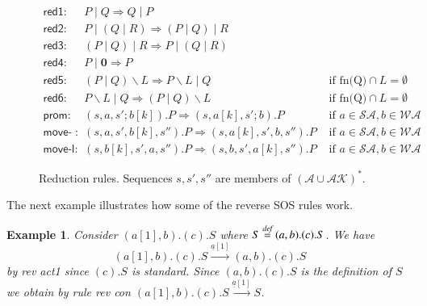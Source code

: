 \documentclass[review]{elsarticle}
\newcommand{\paral}{\; \vert \;}
\newcommand{\Par}{\mid}
\newcommand{\Nil}{\mathbf{0}}
\newcommand{\bydef}{\stackrel{\emph{def}}{=}}
\newcommand{\rulename}[1]{\textsf{#1}}
\newtheorem{example}{Example}
\begin{document}
\begin{figure}[t] 
\[
\begin{array}{lll}
\rulename{red1}: & P\Par Q \Rightarrow Q\Par P& 
\\[10pt]
\rulename{red2}: & P\Par (Q\Par R) \Rightarrow (P\Par Q)\Par R &
\\[10pt]
\rulename{red3}: & (P\Par Q)\Par R \Rightarrow P\Par (Q\Par R) & 
\\[10pt]
\rulename{red4}: & P\Par \Nil \Rightarrow P & 
\\[10pt]
\rulename{red5}: & (P\paral Q)\backslash L \Rightarrow P\backslash L \paral Q & \mbox{ if fn(Q)} \cap L = \emptyset
\\[10pt]
\rulename{red6}: & P\backslash L \paral Q \Rightarrow (P\paral Q)\backslash L & \mbox{ if fn(Q)} \cap L = \emptyset
\\[10pt]
\rulename{prom}: & (s,a,s';b[k]).P \Rightarrow (s,a[k],s';b).P & \mbox{ if } a \in \mathcal{SA}, b \in \mathcal{WA} 
\\[10pt]
\rulename{move-r}: & (s,a,s',b[k],s'').P \Rightarrow (s,a[k],s',b,s'').P & \mbox{ if } a \in \mathcal{SA}, b \in \mathcal{WA}
\\[10pt]
\rulename{move-l}: & (s,b[k],s',a,s'').P \Rightarrow (s,b,s',a[k],s'').P & \mbox{ if } a \in \mathcal{SA}, b \in \mathcal{WA}
\end{array}
\] 
\caption{Reduction rules. Sequences $s, s', s''$ are members of $(\mathcal{A} \cup \mathcal{AK})^{*}$.} 
\label{fig:reduction}
\end{figure}

The next example illustrates how some of the reverse SOS rules work.
\begin{example}
{\rm 
Consider $(a[1],b).(c).S$ where $S\bydef (a,b).(c).S$. We have 
$$(a[1],b).(c).S \xrightarrow{\underline{a}[1]} (a,b).(c).S$$ by \rulename{rev act1} since $(c).S$ is standard.
Since $(a,b).(c).S$ is the definition of $S$ we obtain by rule \rulename{rev con} $(a[1],b).(c).S \xrightarrow{\underline{a}[1]} S$.
}
\end{example}
\end{document}
